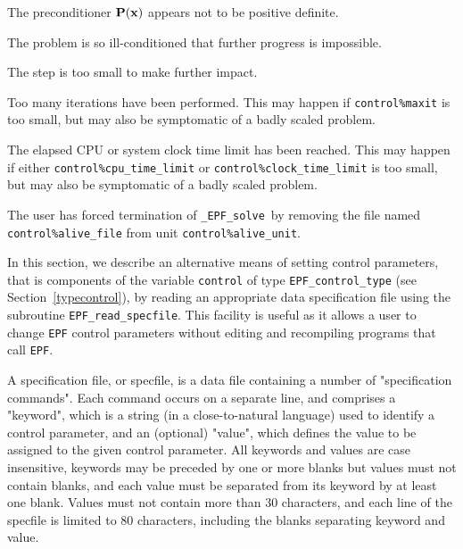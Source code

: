\documentclass{galahad}
\newcommand{\packagename}{EPF}
\newcommand{\fullpackagename}{\libraryname\_\packagename}
\newcommand{\solver}{{\tt \fullpackagename\_solve}}
\begin{document}
\begin{description}
 The preconditioner ${\mathbf{P}}({\mathbf{x}})$ appears not to
  be positive definite.

 The problem is so ill-conditioned that
  further progress is impossible.

 The step is too small to make further impact.

 Too many iterations have been performed.
  This may happen if
    {\tt control\%maxit} is too small, but may also be symptomatic of
    a badly scaled problem.

 The elapsed CPU or system clock time limit has been
    reached. This may happen if either {\tt control\%cpu\_time\_limit} or
    {\tt control\%clock\_time\_limit} is too small, but may also be symptomatic
    of a badly scaled problem.

 The user has forced termination of \solver\
     by removing the file named {\tt control\%a\-live\_file} from
     unit {\tt control\%alive\_unit}.

\end{description}


\galfeatures
\noindent In this section, we describe an alternative means of setting
control parameters, that is components of the variable {\tt control} of type
{\tt \packagename\_control\_type}
(see Section~\ref{typecontrol}),
by reading an appropriate data specification file using the
subroutine {\tt \packagename\_read\_specfile}. This facility
is useful as it allows a user to change  {\tt \packagename} control parameters
without editing and recompiling programs that call {\tt \packagename}.

A specification file, or specfile, is a data file containing a number of
"specification commands". Each command occurs on a separate line,
and comprises a "keyword",
which is a string (in a close-to-natural language) used to identify a
control parameter, and
an (optional) "value", which defines the value to be assigned to the given
control parameter. All keywords and values are case insensitive,
keywords may be preceded by one or more blanks but
values must not contain blanks, and
each value must be separated from its keyword by at least one blank.
Values must not contain more than 30 characters, and
each line of the specfile is limited to 80 characters,
including the blanks separating keyword and value.
\end{document}
